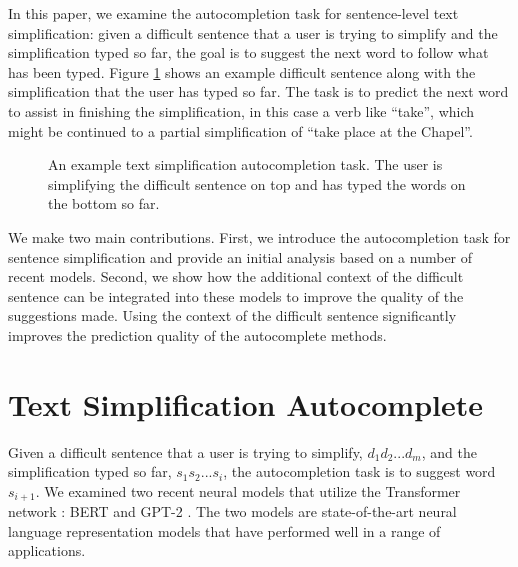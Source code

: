 \documentclass[11pt,a4paper]{article}
\begin{document}
In this paper, we examine the autocompletion task for sentence-level text simplification: given a difficult sentence that a user is trying to simplify and the simplification typed so far, the goal is to suggest the next word to follow what has been typed.  Figure \ref{fig:example} shows an example difficult sentence along with the simplification that the user has typed so far.  The task is to predict the next word to assist in finishing the simplification, in this case a verb like ``take'', which might be continued to a partial simplification of ``take place at the Chapel''.

\begin{figure}
    \centering
    \caption{An example text simplification autocompletion task.  The user is simplifying the difficult sentence on top and has typed the words on the bottom so far.}
    \label{fig:example}
    \vspace{-0.15in}
\end{figure}

We make two main contributions.  First, we introduce the autocompletion task for sentence simplification and provide an initial analysis based on a number of recent models.  Second, we show how the additional context of the difficult sentence can be integrated into these models to improve the quality of the suggestions made.  Using the context of the difficult sentence significantly improves the prediction quality of the autocomplete methods.


\section{Text Simplification Autocomplete}

Given a difficult sentence that a user is trying to simplify, $d_1 d_2 ... d_m$, and the simplification typed so far, $s_1 s_2 ... s_i$, the autocompletion task is to suggest word $s_{i+1}$.   We examined two recent neural models that utilize the Transformer network \cite{vaswani2017attention}: BERT \cite{devlin2018bert} and GPT-2 \cite{radford2019language}.  The two models are state-of-the-art neural language representation models that have performed well in a range of applications.
\end{document}
